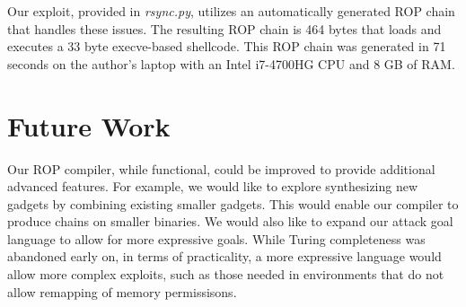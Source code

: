 \documentclass[journal]{IEEEtran}
\begin{document}
Our exploit, provided in \emph{rsync.py}, utilizes an automatically generated ROP chain that handles these issues.
The resulting ROP chain is 464 bytes that loads and executes a 33 byte execve-based shellcode.
This ROP chain was generated in 71 seconds on the author's laptop with an Intel i7-4700HG CPU and 8 GB of RAM.

\section{Future Work}
Our ROP compiler, while functional, could be improved to provide additional advanced
features. For example, we would like to explore synthesizing new gadgets by
combining existing smaller gadgets. This would enable our compiler to produce chains on smaller binaries.
We would also like to expand our attack goal language to allow for more expressive goals.
While Turing completeness was abandoned early on, in terms of practicality, a more expressive language would allow more complex
exploits, such as those needed in environments that do not allow remapping of memory permissisons\cite{grsecurity}.


{}
\end{document}
